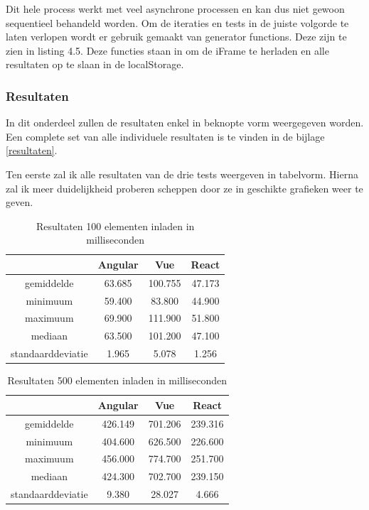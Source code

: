 
Dit hele process werkt met veel asynchrone processen en kan dus niet gewoon sequentieel behandeld worden. Om de iteraties en tests in de juiste volgorde te laten verlopen wordt er gebruik gemaakt van generator functions. Deze zijn te zien in listing 4.5. Deze functies staan in om de iFrame te herladen en alle resultaten op te slaan in de localStorage.


\subsubsection{Resultaten}
\label{sec:resultaten_benchmarks}

In dit onderdeel zullen de resultaten enkel in beknopte vorm weergegeven worden. Een complete set van alle individuele resultaten is te vinden in de bijlage \ref{resultaten}.

Ten eerste zal ik alle resultaten van de drie tests weergeven in tabelvorm. Hierna zal ik meer duidelijkheid proberen scheppen door ze in geschikte grafieken weer te geven.

\begin{table}[h]
	\centering
	\caption{Resultaten 100 elementen inladen in milliseconden}
	\label{table:resultaten_100_elementen}
	\begin{tabular}{|c|c|c|c|} \hline
		                           &Angular     &Vue        &React      \\ \hline
		gemiddelde			&63.685     &100.755  &47.173 \\ \hline
		minimuum			&59.400     &83.800  &44.900 \\ \hline
		maximuum			&69.900    &111.900  &51.800 \\ \hline
		mediaan				   &63.500    &101.200  &47.100 \\ \hline
		standaarddeviatie &1.965        &5.078    &1.256    \\ \hline
	\end{tabular}
\end{table}

\begin{table}[h]
	\centering
	\caption{Resultaten 500 elementen inladen in milliseconden}
	\label{table:resultaten_500_elementen}
	\begin{tabular}{|c|c|c|c|} \hline
								   &Angular     &Vue        &React      \\ \hline
		gemiddelde			&426.149     &701.206  &239.316 \\ \hline
		minimuum			&404.600    &626.500  &226.600 \\ \hline
		maximuum			&456.000    &774.700  &251.700 \\ \hline
		mediaan				   &424.300    &702.700  &239.150 \\ \hline
		standaarddeviatie &9.380       &28.027    &4.666    \\ \hline
	\end{tabular}
\end{table}

